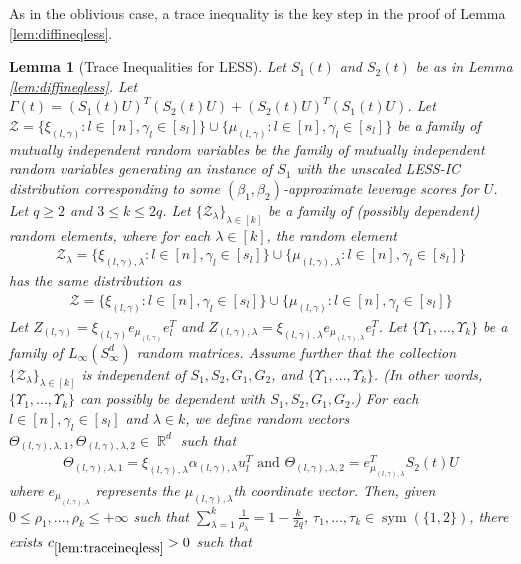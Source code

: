 \documentclass[11pt]{amsart}
\numberwithin{equation}{section}
\numberwithin{equation}{section}
\DeclareMathOperator{\R}{\mathbb{R}}
\DeclareMathOperator{\sym}{sym}
\newtheorem{lemma}[theorem]{Lemma}
\theoremstyle{remark}
\theoremstyle{definition}
\begin{document}
As in the oblivious case, a trace inequality is the key step in the proof of Lemma \ref{lem:diffineqless}.
\begin{lemma} [Trace Inequalities for LESS]\label{lem:traceineqless}
Let $S_1(t)$ and $S_2(t)$ be as in Lemma \ref{lem:diffineqless}. Let $\Gamma(t)=(S_1(t)U)^T(S_2(t)U)+(S_2(t)U)^T(S_1(t)U)$. Let $\mathcal{Z}=\{\xi_{(l,\gamma)}: l \in [n], \gamma_l \in [s_l] \} \cup \{\mu_{(l,\gamma)}:l \in [n], \gamma_l \in [s_l] \}$ be a family of mutually independent random variables be the family of mutually independent random variables generating an instance of $S_1$ with the unscaled LESS-IC distribution corresponding to some $(\beta_1, \beta_2)$-approximate leverage scores for $U$. Let $q \ge 2$ and $3 \le k \le 2q$. Let $\{\mathcal{Z}_{\lambda}\}_{\lambda \in [k]}$ be a family of (possibly dependent) random elements, where for each $\lambda \in [k]$, the random element
\begin{align*}
    \mathcal{Z}_{\lambda}=\{\xi_{(l,\gamma),\lambda}:l \in [n], \gamma_l \in [s_l]\} \cup \{\mu_{(l,\gamma),\lambda}:l \in [n], \gamma_l \in [s_l]\}
\end{align*}
has the same distribution as 
\begin{align*}
    \mathcal{Z}=\{\xi_{(l,\gamma)}:l \in [n], \gamma_l \in [s_l]\} \cup \{\mu_{(l,\gamma)}:l \in [n], \gamma_l \in [s_l]\}
\end{align*}
Let $Z_{(l,\gamma)}=\xi_{(l,\gamma)} e_{\mu_{(l, \gamma)}} e_l ^T$ and $Z_{(l,\gamma),\lambda}=\xi_{(l,\gamma),\lambda} e_{\mu_{(l, \gamma),\lambda}} e_l ^T$.
Let $\{\Upsilon_1,...,\Upsilon_k\}$ be a family of $L_{\infty}(S_{\infty}^d)$ random matrices.
Assume further that the collection $\{\mathcal{Z}_{\lambda}\}_{\lambda \in [k]}$ is independent of $S_1, S_2, G_1, G_2$, and $\{\Upsilon_1,...,\Upsilon_k\}$. (In other words, $\{\Upsilon_1,...,\Upsilon_k\}$ can possibly be dependent with $S_1, S_2, G_1, G_2$.)
For each $l \in [n], \gamma_l \in [s_l]$ and $\lambda \in k$, we define random vectors $\Theta_{(l,\gamma), \lambda, 1}, \Theta_{(l,\gamma), \lambda, 2} \in \R^d$ such that
\begin{align*}
    \Theta_{(l,\gamma), \lambda, 1} = \xi_{(l,\gamma),\lambda} \alpha_{(l,\gamma),\lambda} u_l^T \text{ and } \Theta_{(l,\gamma), \lambda, 2} = e_{\mu_{(l,\gamma),\lambda}}^TS_2(t)U
\end{align*}
where $e_{\mu_{(l,\gamma),\lambda}}$ represents the $\mu_{(l,\gamma),\lambda}$th coordinate vector. Then, given $0 \le \rho_1,...,\rho_k \le +\infty$ such that $\sum \limits_{\lambda=1}^k \frac{1}{\rho_{\lambda}}=1-\frac{k}{2q}$, $\tau_1, \ldots, \tau_k \in \sym(\{1,2 \})$, there exists $c_{\ref*{lem:traceineqless}} >0$ such that

\end{lemma}
\end{document}

